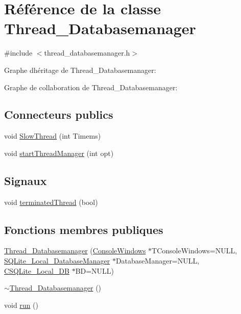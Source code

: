 \hypertarget{class_thread___databasemanager}{}\section{Référence de la classe Thread\+\_\+\+Databasemanager}
\label{class_thread___databasemanager}


{\ttfamily \#include $<$thread\+\_\+databasemanager.\+h$>$}



Graphe d\textquotesingle{}héritage de Thread\+\_\+\+Databasemanager\+:


Graphe de collaboration de Thread\+\_\+\+Databasemanager\+:
\subsection*{Connecteurs publics}
\begin{DoxyCompactItemize}
\item 
void \hyperlink{class_thread___databasemanager_a7392689aed5d724bf32d9095533a8d26}{Slow\+Thread} (int Timems)
\item 
void \hyperlink{class_thread___databasemanager_ad76322d03f5401fd9b15f663f1592663}{start\+Thread\+Manager} (int opt)
\end{DoxyCompactItemize}
\subsection*{Signaux}
\begin{DoxyCompactItemize}
\item 
void \hyperlink{class_thread___databasemanager_a07d383177f9b390ca6feea9684bd78c8}{terminated\+Thread} (bool)
\end{DoxyCompactItemize}
\subsection*{Fonctions membres publiques}
\begin{DoxyCompactItemize}
\item 
\hyperlink{class_thread___databasemanager_a50de7d2d2fe1de697657936a768768d5}{Thread\+\_\+\+Databasemanager} (\hyperlink{class_console_windows}{Console\+Windows} $\ast$T\+Console\+Windows=N\+U\+L\+L, \hyperlink{class_s_q_lite___local___database_manager}{S\+Q\+Lite\+\_\+\+Local\+\_\+\+Database\+Manager} $\ast$Database\+Manager=N\+U\+L\+L, \hyperlink{class_c_s_q_lite___local___d_b}{C\+S\+Q\+Lite\+\_\+\+Local\+\_\+\+D\+B} $\ast$B\+D=N\+U\+L\+L)
\item 
\hyperlink{class_thread___databasemanager_a4e3f0a1ebcb2eecf99129f7fed1b3b0a}{$\sim$\+Thread\+\_\+\+Databasemanager} ()
\item 
void \hyperlink{class_thread___databasemanager_a05d712f64b4838e59bbd8e82f4620d0b}{run} ()
\end{DoxyCompactItemize}


